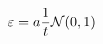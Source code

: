 \vspace{-0.1cm}
\begin{equation}
    \varepsilon = a \frac{1}{t} \mathcal{N}(0, 1)
    \label{eq:noise}
    \vspace{-0.05cm}
\end{equation}
